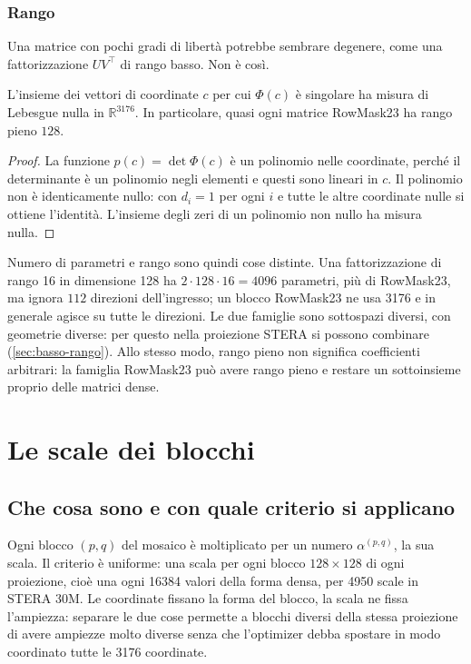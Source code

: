 \subsubsection{Rango}

Una matrice con pochi gradi di libertà potrebbe sembrare degenere, come una fattorizzazione $UV^\top$ di rango basso. Non è così.

\begin{proposizione}
L'insieme dei vettori di coordinate $c$ per cui $\Phi(c)$ è singolare ha misura di Lebesgue nulla in $\mathbb{R}^{3176}$. In particolare, quasi ogni matrice RowMask23 ha rango pieno $128$.
\end{proposizione}

\begin{proof}
La funzione $p(c)=\det\Phi(c)$ è un polinomio nelle coordinate, perché il determinante è un polinomio negli elementi e questi sono lineari in $c$. Il polinomio non è identicamente nullo: con $d_i=1$ per ogni $i$ e tutte le altre coordinate nulle si ottiene l'identità. L'insieme degli zeri di un polinomio non nullo ha misura nulla.
\end{proof}

Numero di parametri e rango sono quindi cose distinte. Una fattorizzazione di rango 16 in dimensione 128 ha $2\cdot128\cdot16=\num{4096}$ parametri, più di RowMask23, ma ignora $112$ direzioni dell'ingresso; un blocco RowMask23 ne usa \num{3176} e in generale agisce su tutte le direzioni. Le due famiglie sono sottospazi diversi, con geometrie diverse: per questo nella proiezione STERA si possono combinare (\autoref{sec:basso-rango}). Allo stesso modo, rango pieno non significa coefficienti arbitrari: la famiglia RowMask23 può avere rango pieno e restare un sottoinsieme proprio delle matrici dense.



\section{Le scale dei blocchi}
\label{sec:scale}

\subsection{Che cosa sono e con quale criterio si applicano}
Ogni blocco $(p,q)$ del mosaico è moltiplicato per un numero $\alpha^{(p,q)}$, la sua scala. Il criterio è uniforme: una scala per ogni blocco $128\times128$ di ogni proiezione, cioè una ogni \num{16384} valori della forma densa, per \num{4950} scale in STERA 30M. Le coordinate fissano la forma del blocco, la scala ne fissa l'ampiezza: separare le due cose permette a blocchi diversi della stessa proiezione di avere ampiezze molto diverse senza che l'optimizer debba spostare in modo coordinato tutte le \num{3176} coordinate.

